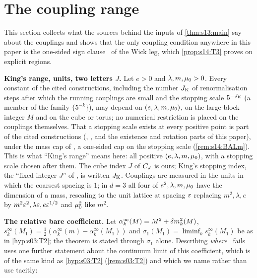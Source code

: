 \section{The coupling range}

\providecommand{\sxivNE}{\ensuremath{(\mathrm{NE})}}
\providecommand{\sxivNEl}{\ensuremath{(\mathrm{NE}^{<})}}
\providecommand{\sxivCT}{\ensuremath{(\mathrm{CT}_{\infty})}}

This section collects what the sources behind the inputs of \cref{thm:s13:main} say about the couplings and shows that the only coupling condition anywhere in this paper is the one-sided sign clause \Tthree\ of the Wick leg, which \cref{prop:s14:T3} proves on explicit regions.

\medskip\noindent\textbf{King's range, units, two letters $J$.} Let $e>0$ and $\lambda,m,\mu_0>0$. Every constant of the cited constructions, including the number $J_{\rm K}$ of renormalisation steps after which the running couplings are small and the stopping scale $5^{-J_{\rm K}}$ (a member of the family $\{5^{-k}\}$), may depend on $(e,\lambda,m,\mu_0)$, on the large-block integer $M$ and on the cube or torus; no numerical restriction is placed on the couplings themselves. That a stopping scale exists at every positive point is part of the cited constructions (\cite[Thm.~3.1]{K1}, \cite{Ba1,Ba2,Ba3,Ba4}, and the existence and rotation parts of this paper), under the mass cap of \cite[Prop.~3.1]{Ba2}, a one-sided cap on the stopping scale (\cref{rem:s14:BALm}). This is what ``King's range'' means here: all positive $(e,\lambda,m,\mu_0)$, with a stopping scale chosen after them. The cube index $J$ of $C_J$ is ours; King's stopping index, the ``fixed integer $J$'' of \cite[Thm.~3.1]{K1}, is written $J_{\rm K}$. Couplings are measured in the units in which the coarsest spacing is $1$; in $d=3$ all four of $e^2,\lambda,m,\mu_0$ have the dimension of a mass, rescaling to the unit lattice at spacing $\varepsilon$ replacing $m^2,\lambda,e$ by $m^2\varepsilon^2,\lambda\varepsilon,e\varepsilon^{1/2}$ \cite[Sect.~0]{K1} and $\mu_0^2$ like $m^2$.

\medskip\noindent\textbf{The relative bare coefficient.} Let $\alpha^\infty_k(M)=M^2+\delta m^2_k(M)$, $s^\infty_k(M_1)=\frac12(\alpha^\infty_k(m)-\alpha^\infty_k(M_1))$ and $\sigma_1(M_1)=\liminf_ks^\infty_k(M_1)$ be as in \cref{hyp:s03:T2}; the theorem is stated through $\sigma_1$ alone. Describing \emph{where} \Tthree\ fails uses one further statement about the continuum limit of this coefficient, which is of the same kind as \cref{hyp:s03:T2} (\cref{rem:s03:T2}) and which we name rather than use tacitly:

